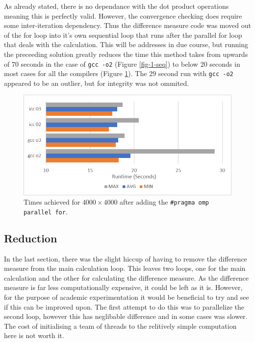 \documentclass[11pt,twocolumn,a4paper]{article}
\begin{document}
As already stated, there is no dependance with the dot product operations meaning this is perfectly valid. However, the convergence checking does require some inter-iteration dependency. Thus the difference measure code was moved out of the for loop into it's own sequential loop that runs after the parallel for loop that deals with the calculation. This will be addresses in due course, but running the preceeding solution greatly reduces the time this method takes from upwards of 70 seconds in the case of \texttt{gcc -o2} (Figure \ref{fig-1-seq}) to below 20 seconds in most cases for all the compilers (Figure \ref{fig-2-omp}). The 29 second run with \texttt{gcc -o2} appeared to be an outlier, but for integrity was not ommited. \par

\begin{figure}[h]
        \centering
        \includegraphics[width=0.8\linewidth]{figures/2-OMP-OUTER.png}
        \caption{Times achieved for $4000\times4000$ after adding the \texttt{\#pragma omp parallel for}.}
        \label{fig-2-omp}
\end{figure}


\subsection{Reduction}
In the last section, there was the slight hiccup of having to remove the difference measure from the main calculation loop. This leaves two loops, one for the main calculation and the other for calculating the difference measure. As the difference measure is far less computationally expensive, it could be left as it is. However, for the purpose of academic experimentation it would be beneficial to try and see if this can be improved upon. The first attempt to do this was to parallelize the second loop, however this has neglibable difference and in some cases was slower. The cost of initialising a team of threads to the relitively simple computation here is not worth it. \par
\end{document}
